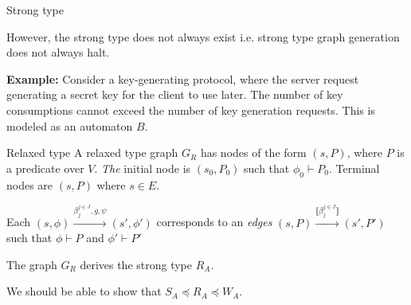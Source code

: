 \begin{frame}{Strong type}

  However, the strong type does not always exist i.e. strong type graph generation does not always halt.

  \textbf{Example:}  Consider a key-generating protocol, where the server request generating a secret key for the client to use later. The number of key consumptions cannot exceed the number of key generation requests. This is modeled as an automaton $B$.

  \begin{figure}[ht]
    \centering
  \end{figure}
\end{frame}

\begin{frame}{Relaxed type}
  A relaxed type graph $G_R$ has nodes of the form $(s,P)$, where $P$ is a predicate over $V$. \textit{The} initial node is $(s_0,P_0)$ such that $\phi_0\vdash P_0$. Terminal nodes are $(s, P)$ where $s\in E$.

  Each $(s,\phi)\xrightarrow{\beta_{j}^{j\in J}, g, \psi}(s',\phi')$ corresponds to an \textit{edges} $(s,P)\xrightarrow{\llbracket\beta_{j}^{j\in J}\rrbracket}(s',P')$ such that $\phi\vdash P$ and $\phi'\vdash P'$

  The graph $G_R$ derives the strong type $R_A$.

  We should be able to show that $S_A\preceq R_A\preceq W_A$.
\end{frame}

